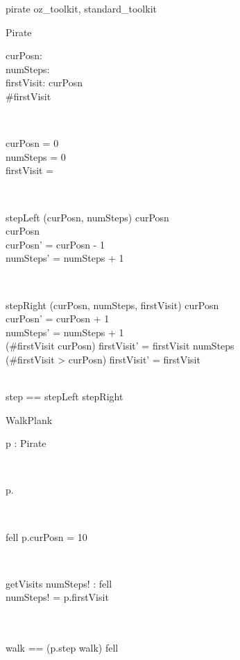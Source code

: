 \documentclass[11pt,a4paper]{article}
\begin{document}
\begin{zsection}
  \SECTION pirate \parents oz\_toolkit, standard\_toolkit
\end{zsection}

\begin{class}{Pirate}
\also
	\begin{state}
		curPosn: \nat \\
		numSteps: \nat \\
		firstVisit: \seq \nat
	\where
		curPosn  \\
		\#firstVisit 
	\end{state} \\
	\begin{init}
		curPosn = 0 \\
		numSteps = 0 \\
		firstVisit = \langle \rangle
	\end{init} \\
	\begin{schema}{stepLeft}
		\Delta (curPosn, numSteps)
	\where	
	        curPosn  \\
		curPosn \neq 10 \\
		curPosn' = curPosn - 1 \\
		numSteps' = numSteps + 1 \\
	\end{schema} \\
	\begin{schema}{stepRight}
		\Delta (curPosn, numSteps, firstVisit)
	\where
	        curPosn  \\
        	curPosn' = curPosn + 1 \\
	        numSteps' = numSteps + 1 \\
		(\#firstVisit \leq curPosn) \implies firstVisit' = firstVisit \cat
			\langle numSteps \rangle \\
		(\#firstVisit > curPosn) \implies firstVisit' = firstVisit
	\end{schema} \\
	step == stepLeft \gch stepRight
	\end{class}

\begin{class}{WalkPlank}
\also
        \begin{state}
                p : Pirate
        \end{state} \\
	\begin{init}
		p.\Init
	\end{init}\\
	\begin{schema}{fell}
        \where
		p.curPosn = 10
	\end{schema} \\
	\begin{schema}{getVisits}
		numSteps! : \seq \nat
	\where
		fell \\
		numSteps! = p.firstVisit
	\end{schema} \\
	\\
        walk == (p.step \semi walk) \gch fell
\end{class}
\end{document}
